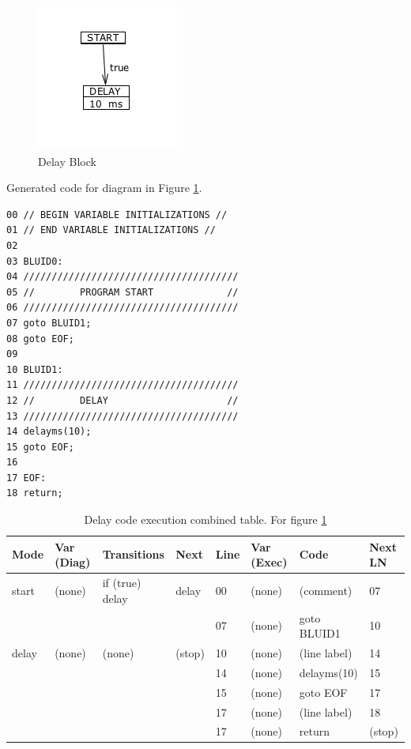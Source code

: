 \begin{figure}[h]
	\centering
	\includegraphics[width=\imgmedsmall]{./images/correctness_ex_delay.png}
	\caption{Delay Block}
	\label{fig:correctness_ex_delay}
\end{figure}

Generated  code for diagram in Figure \ref{fig:correctness_ex_delay}.
\begin{lstlisting}[frame=single]
00 // BEGIN VARIABLE INITIALIZATIONS //
01 // END VARIABLE INITIALIZATIONS //
02 
03 BLUID0:
04 //////////////////////////////////////
05 //        PROGRAM START             //
06 //////////////////////////////////////
07 goto BLUID1;
08 goto EOF;
09 
10 BLUID1:
11 //////////////////////////////////////
12 //        DELAY                     //
13 //////////////////////////////////////
14 delayms(10);
15 goto EOF;
16
17 EOF:
18 return;
\end{lstlisting}


\begin{table}[h]
	\caption{Delay code execution combined table. For figure \ref{fig:correctness_ex_delay}}
	\centering
	\tablefontsize
		\begin{tabular}{| p{} | p{} | p{} | p{} | p{} | p{} | p{} | p{} |}
			\hline
			\textbf{Mode} 		&	\textbf{Var (Diag)} 		& 	\textbf{Transitions} 		& 	\textbf{Next}		&	\textbf{Line}		&	\textbf{Var (Exec)	}	&	\textbf{Code}	&	\textbf{Next LN} \\
			\hline
			start 				&	(none)						&	if (true) delay				&	delay				&	00					&	(none)					& 	(comment)		&	07 \\
			\hline
								&								&								&						&	07					& 	(none)					& 	goto BLUID1		& 	10 \\
			\hline
			delay				&	(none)						&	(none)						&	(stop)				&	10					&	(none)					&	(line label)	&	14 \\
			\hline
								&								&								&						&	14					&	(none)					&	delayms(10)		&	15 \\
			\hline
								&								&								&						&	15					&	(none)					&	goto EOF		&	17 \\
			\hline
								&								&								&						&	17					&	(none)					&	(line label)	&	18 \\
			\hline
								&								&								&						&	17					&	(none)					&	return			&	(stop) \\
			\hline
		\end{tabular}
	\label{table:DelayExecCombined}
\end{table}

